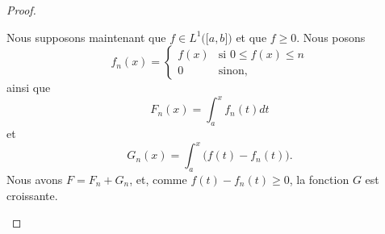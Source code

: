 \begin{proof}
\begin{subproof}
		\spitem[Si \( f\in L^1\) et \( f\geq 0\)]
		Nous supposons maintenant que \( f\in L^1\big( \mathopen[ a,b\mathclose] \big)\) et que \( f\geq 0\). Nous posons
		\begin{equation}
			f_n(x)=\begin{cases}
				f(x) & \text{si } 0\leq f(x)\leq n \\
				0    & \text{sinon, }
			\end{cases}
		\end{equation}
		ainsi que
		\begin{equation}
			F_n(x)=\int_a^xf_n(t)dt
		\end{equation}
		et
		\begin{equation}
			G_n(x)=\int_a^x\big( f(t)-f_n(t) \big).
		\end{equation}
		Nous avons \( F=F_n+G_n\), et, comme \( f(t)-f_n(t)\geq 0\), la fonction \( G\) est croissante.


\end{subproof}
\end{proof}
